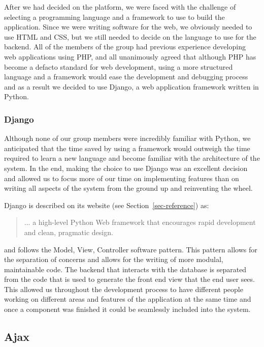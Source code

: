 \documentclass[11pt]{article}
\begin{document}
After we had decided on the platform, we were faced with the challenge
of selecting a programming language and a framework to use to build
the application. Since we were writing software for the web, we
obviously needed to use HTML and CSS, but we still needed to decide on
the language to use for the backend. All of the members of the group
had previous experience developing web applications using PHP, and all
unanimously agreed that although PHP has become a defacto standard for
web development, using a more structured language and a framework
would ease the development and debugging process and as a result we
decided to use Django, a web application framework written in Python.

\subsubsection{Django}
\label{sec-django}

Although none of our group members were incredibly familiar with
Python, we anticipated that the time saved by using a framework would
outweigh the time required to learn a new language and become familiar
with the architecture of the system. In the end, making the choice to
use Django was an excellent decision and allowed us to focus more of
our time on implementing features than on writing all aspects of the
system from the ground up and reinventing the wheel.

Django is described on its website (see Section~\vref{sec-reference})
as:

\begin{quotation}
  ... a high-level Python Web framework that encourages rapid
  development and clean, pragmatic design.
\end{quotation}

and follows the Model, View, Controller software pattern. This pattern
allows for the separation of concerns and allows for the writing of
more modulal, maintainable code. The backend that interacts with the
database is separated from the code that is used to generate the front
end view that the end user sees. This allowed us throughout the
development process to have different people working on different
areas and features of the application at the same time and once a
component was finished it could be seamlessly included into the
system.


\subsection{Ajax}
\label{sec-ajax}
\end{document}
